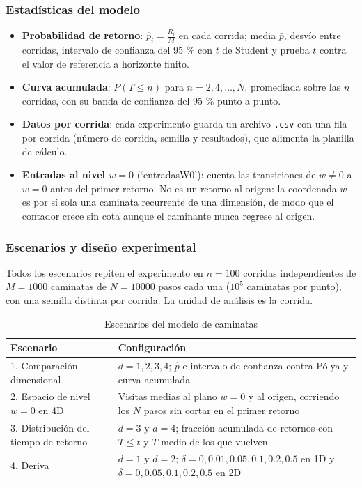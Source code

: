 \documentclass{article}
\begin{document}
\subsubsection{Estadísticas del modelo}
\begin{itemize}
    \item \textbf{Probabilidad de retorno}: $\hat p_i=\frac{R_i}{M}$ en cada corrida; media $\bar p$, desvío entre corridas, intervalo de confianza del 95 \% con $t$ de Student y prueba $t$ contra el valor de referencia a horizonte finito.
    \item \textbf{Curva acumulada}: $P(T\leq n)$ para $n=2,4,\ldots,N$, promediada sobre las $n$ corridas, con su banda de confianza del 95 \% punto a punto.
    \item \textbf{Datos por corrida}: cada experimento guarda un archivo \texttt{.csv} con una fila por corrida (número de corrida, semilla y resultados), que alimenta la planilla de cálculo.
    \item \textbf{Entradas al nivel $w=0$} (`entradasW0'): cuenta las transiciones de $w\neq0$ a $w=0$ antes del primer retorno. No es un retorno al origen: la coordenada $w$ es por sí sola una caminata recurrente de una dimensión, de modo que el contador crece sin cota aunque el caminante nunca regrese al origen.
\end{itemize}

\subsubsection{Escenarios y diseño experimental}
Todos los escenarios repiten el experimento en $n=100$ corridas independientes de $M=1000$ caminatas de $N=10000$ pasos cada una ($10^5$ caminatas por punto), con una semilla distinta por corrida. La unidad de análisis es la corrida.

\begin{table}[h]
\centering
\renewcommand{\arraystretch}{1.3}
\caption{Escenarios del modelo de caminatas}
\begin{tabularx}{\textwidth}{ | Y | Y | }
    \hline
    \textbf{Escenario} & \textbf{Configuración} \\
    . Comparación dimensional & $d=1,2,3,4$; $\hat p$ e intervalo de confianza contra Pólya y curva acumulada \\
    . Espacio de nivel $w=0$ en 4D & Visitas medias al plano $w=0$ y al origen, corriendo los $N$ pasos sin cortar en el primer retorno \\
    . Distribución del tiempo de retorno & $d=3$ y $d=4$; fracción acumulada de retornos con $T\leq t$ y $T$ medio de los que vuelven \\
    . Deriva & $d=1$ y $d=2$; $\delta=0,0.01,0.05,0.1,0.2,0.5$ en 1D y $\delta=0,0.05,0.1,0.2,0.5$ en 2D \\
    \hline
\end{tabularx}
\end{table}
\end{document}

